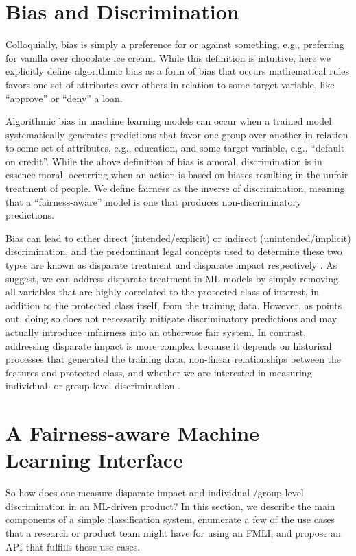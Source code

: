 \documentclass{acm_proc_article-sp}
\begin{document}
\section{Bias and Discrimination}
Colloquially, bias is simply a preference for or against something, e.g.,
preferring for vanilla over chocolate ice cream. While this definition is
intuitive, here we explicitly define algorithmic bias as a form of bias that
occurs mathematical rules favors one set of attributes over others in relation
to some target variable, like ``approve'' or ``deny'' a loan.

Algorithmic bias in machine learning models can occur when a trained model
systematically generates predictions that favor one group over another in
relation to some set of attributes, e.g., education, and some target variable,
e.g., ``default on credit''. While the above definition of bias is amoral,
discrimination is in essence moral, occurring when an action is based on biases
resulting in the unfair treatment of people. We define fairness as the inverse
of discrimination, meaning that a ``fairness-aware'' model is one that produces
non-discriminatory predictions.

Bias can lead to either direct (intended/explicit) or indirect
(unintended/implicit) discrimination, and the predominant legal concepts used to
determine these two types are known as disparate treatment and disparate impact
respectively \cite{barocas2016big}. As \cite{kusner2017counterfactual,
kamiran2012data} suggest, we can address disparate treatment in ML models by
simply removing all variables that are highly correlated to the protected class
of interest, in addition to the protected class itself, from the training data.
However, as \cite{kusner2017counterfactual} points out, doing so does not
necessarily mitigate discriminatory predictions and may actually introduce
unfairness into an otherwise fair system. In contrast, addressing disparate
impact is more complex because it depends on historical processes that generated
the training data, non-linear relationships between the features and protected
class, and whether we are interested in measuring individual- or group-level
discrimination \cite{dwork2012fairness}.

\section{A Fairness-aware Machine Learning Interface} So how does one measure
disparate impact and individual-/group-level discrimination in an ML-driven
product? In this section, we describe the main components of a simple
classification system, enumerate a few of the use cases that a research or
product team might have for using an FMLI, and propose an API that fulfills
these use cases.
\end{document}
